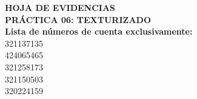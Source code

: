 \documentclass[letterpaper, 11pt]{article}
\newcommand{\numPractica}{06}
\newcommand{\tituloPractica}{Texturizado}
\newcommand{\cuentasEvidencias}{
    321137135 \\ 
    424065465 \\ 
    321258173 \\ 
    321150503 \\ 
    320224159 \\ 
}
\begin{document}


\newpage
{}
\setcounter{page}{2}

\begin{center}
    {\Large\bfseries HOJA DE EVIDENCIAS}\\[0.35cm]
    {\large\bfseries PRÁCTICA \numPractica: \MakeUppercase{\tituloPractica}}\\[0.35cm]
    \textbf{Lista de números de cuenta exclusivamente:}\\
    \cuentasEvidencias
\end{center}
\vspace{0.6cm}
\newpage









\end{document}
